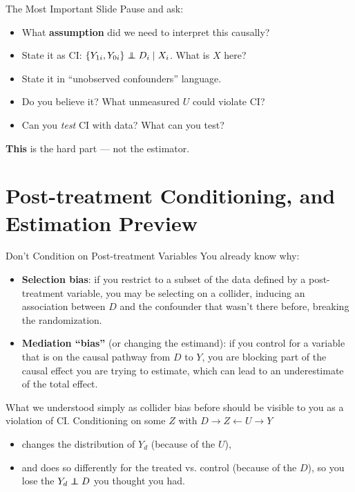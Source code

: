 \documentclass[xcolor=dvipsnames]{beamer}
\newcommand\indep{\protect\mathpalette{\protect\independenT}{\perp}}
\def\independenT#1#2{\mathrel{\rlap{$#1#2$}\mkern2mu{#1#2}}}
\begin{document}
\begin{frame}{The Most Important Slide}
\small
{} Pause and ask:
\begin{itemize}
\item<2-> What \textbf{assumption} did we need to interpret this causally?
\medskip
\item<3-> State it as CI: $\{Y_{1i}, Y_{0i}\} \indep D_i \mid X_i$. What is $X$ here?
\medskip
\item<4-> State it in ``unobserved confounders'' language.
\medskip
\item<5-> Do you believe it?  What unmeasured $U$ could violate CI?
\medskip
\item<6-> Can you \textit{test} CI with data?  What can you test?
\end{itemize}

\bigskip
{} \textbf{This} is the hard part --- not the estimator.
\end{frame}


\section{Post-treatment Conditioning, and Estimation Preview}

\begin{frame}{Don't Condition on Post-treatment Variables}
\small
{} You already know why: 
\begin{itemize}
\footnotesize
\item<2-> \textbf{Selection bias}: if you restrict to a subset of the data defined by a post-treatment variable, you may be selecting on a collider, inducing an association between $D$ and the confounder that wasn't there before, breaking the randomization. 
\item<3-> \textbf{Mediation ``bias''} (or changing the estimand): if you control for a variable that is on the causal pathway from $D$ to $Y$, you are blocking part of the causal effect you are trying to estimate, which can lead to an underestimate of the total effect.
\end{itemize} 

 What we understood simply as collider bias before should be visible to you as a violation of CI. Conditioning on some $Z$ with $D \rightarrow Z \leftarrow U \rightarrow Y$ 
\begin{itemize}
\footnotesize
\item  changes the distribution of $Y_d$ (because of the $U$),
\item and does so differently for the treated vs. control (because of the $D$), so you lose the $Y_d \indep D$ you thought you had.
\end{itemize}
\end{frame}
\end{document}

